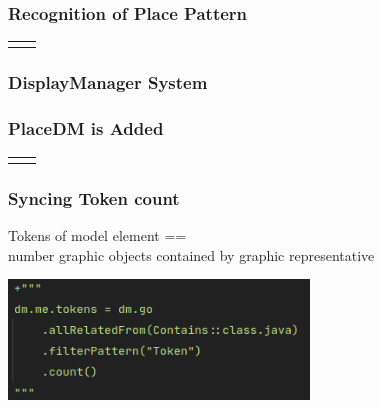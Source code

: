 \begin{frame}
  \frametitle{Recognition of Place Pattern}
  \hspace*{-1.5cm}
  \begin{tabular}{m{10cm}  m{5cm}}
    
     &
    \vspace{2.5cm}
    
  \end{tabular}
\end{frame}

\begin{frame}
  \frametitle{DisplayManager System}
  \hspace{-1cm}
  \centering
  
\end{frame}

\begin{frame}
  \frametitle{PlaceDM is Added}
  \hspace*{-1.5cm}
  \begin{tabular}{m{10cm}  m{5cm}}
    
     &
    \vspace{2.5cm}
    
  \end{tabular}
\end{frame}




\begin{frame}
  \frametitle{Syncing Token count}

  Tokens of model element == \\number graphic objects contained by graphic representative

  \vspace{1cm}
  \centering
  \hspace{-1cm}
  \includegraphics[width=8cm]{images/token-sync}

\end{frame}


